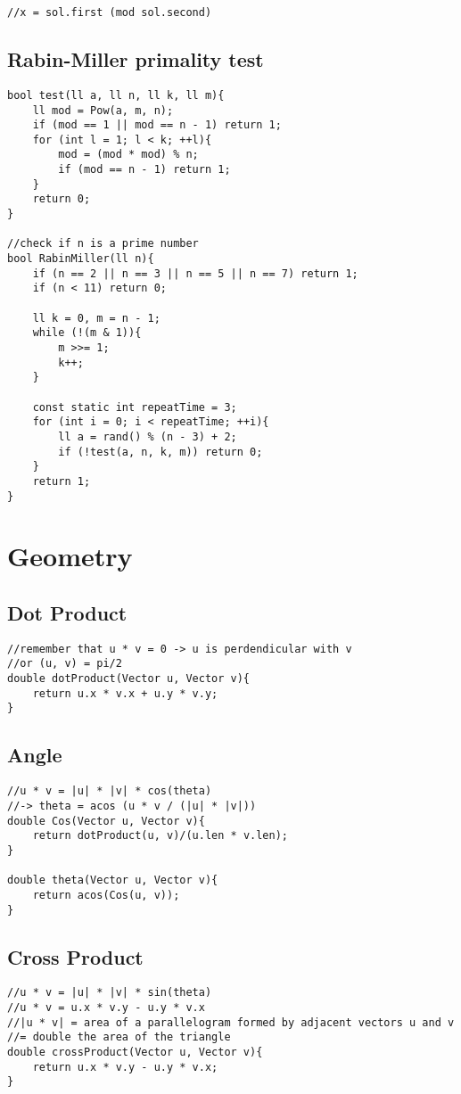 \documentclass[11pt,a4paper]{article}
\begin{document}
\begin{multicols*}{2}
\begin{lstlisting}
//x = sol.first (mod sol.second)
\end{lstlisting}

\subsection{Rabin-Miller primality test}
\begin{lstlisting}
bool test(ll a, ll n, ll k, ll m){
    ll mod = Pow(a, m, n);
    if (mod == 1 || mod == n - 1) return 1;
    for (int l = 1; l < k; ++l){
        mod = (mod * mod) % n;
        if (mod == n - 1) return 1;
    }
    return 0;
}

//check if n is a prime number
bool RabinMiller(ll n){
    if (n == 2 || n == 3 || n == 5 || n == 7) return 1;
    if (n < 11) return 0;

    ll k = 0, m = n - 1;
    while (!(m & 1)){
        m >>= 1;
        k++;
    }

    const static int repeatTime = 3;
    for (int i = 0; i < repeatTime; ++i){
        ll a = rand() % (n - 3) + 2;
        if (!test(a, n, k, m)) return 0;
    }
    return 1;
}
\end{lstlisting}

\section{Geometry}
\subsection{Dot Product}
\begin{lstlisting}
//remember that u * v = 0 -> u is perdendicular with v
//or (u, v) = pi/2
double dotProduct(Vector u, Vector v){
    return u.x * v.x + u.y * v.y; 
}
\end{lstlisting}
\subsection{Angle}
\begin{lstlisting}
//u * v = |u| * |v| * cos(theta)
//-> theta = acos (u * v / (|u| * |v|))
double Cos(Vector u, Vector v){
    return dotProduct(u, v)/(u.len * v.len);
}

double theta(Vector u, Vector v){
    return acos(Cos(u, v));
}
\end{lstlisting}

\subsection{Cross Product}
\begin{lstlisting}
//u * v = |u| * |v| * sin(theta)
//u * v = u.x * v.y - u.y * v.x
//|u * v| = area of a parallelogram formed by adjacent vectors u and v 
//= double the area of the triangle 
double crossProduct(Vector u, Vector v){
    return u.x * v.y - u.y * v.x;
}
\end{lstlisting}


\end{multicols*}
\end{document}

